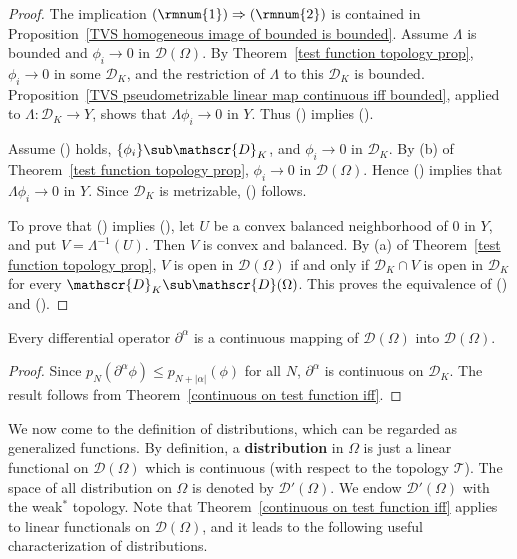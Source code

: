 \begin{proof}
The implication $(\rmnum{1})\Rightarrow(\rmnum{2})$ is contained in Proposition~\ref{TVS homogeneous image of bounded is bounded}. Assume $\Lambda$ is bounded and $\phi_i\to 0$ in $\mathscr{D}(\Omega)$. By Theorem~\ref{test function topology prop}, $\phi_i\to 0$ in some $\mathscr{D}_K$, and the restriction of $\Lambda$ to this $\mathscr{D}_K$ is bounded. Proposition~\ref{TVS pseudometrizable linear map continuous iff bounded}, applied to $\Lambda:\mathscr{D}_K\to Y$, shows that $\Lambda\phi_i\to 0$ in $Y$. Thus () implies ().\par
Assume () holds, $\{\phi_i\}\sub\mathscr{D}_K$, and $\phi_i\to 0$ in $\mathscr{D}_K$. By (b) of Theorem~\ref{test function topology prop}, $\phi_i\to 0$ in $\mathscr{D}(\Omega)$. Hence () implies that $\Lambda\phi_i\to 0$ in $Y$. Since $\mathscr{D}_K$ is metrizable, () follows.\par
To prove that () implies (), let $U$ be a convex balanced neighborhood of $0$ in $Y$, and put $V=\Lambda^{-1}(U)$. Then $V$ is convex and balanced. By (a) of Theorem~\ref{test function topology prop}, $V$ is open in $\mathscr{D}(\Omega)$ if and only if $\mathscr{D}_K\cap V$ is open in $\mathscr{D}_K$ for every $\mathscr{D}_K\sub\mathscr{D}(\Omega)$. This proves the equivalence of () and ().
\end{proof}
\begin{corollary}
Every differential operator $\partial^\alpha$ is a continuous mapping of $\mathscr{D}(\Omega)$ into $\mathscr{D}(\Omega)$.
\end{corollary}
\begin{proof}
Since $p_N(\partial^\alpha\phi)\leq p_{N+|\alpha|}(\phi)$ for all $N$, $\partial^\alpha$ is continuous on $\mathscr{D}_K$. The result follows from Theorem~\ref{continuous on test function iff}.
\end{proof}
We now come to the definition of distributions, which can be regarded as generalized functions. By definition, a \textbf{distribution} in $\Omega$ is just a linear functional on $\mathscr{D}(\Omega)$ which is continuous (with respect to the topology $\mathcal{T}$). The space of all distribution on $\Omega$ is denoted by $\mathscr{D}'(\Omega)$. We endow $\mathscr{D}'(\Omega)$ with the weak$^*$ topology. Note that Theorem~\ref{continuous on test function iff} applies to linear functionals on $\mathscr{D}(\Omega)$, and it leads to the following useful characterization of distributions.
